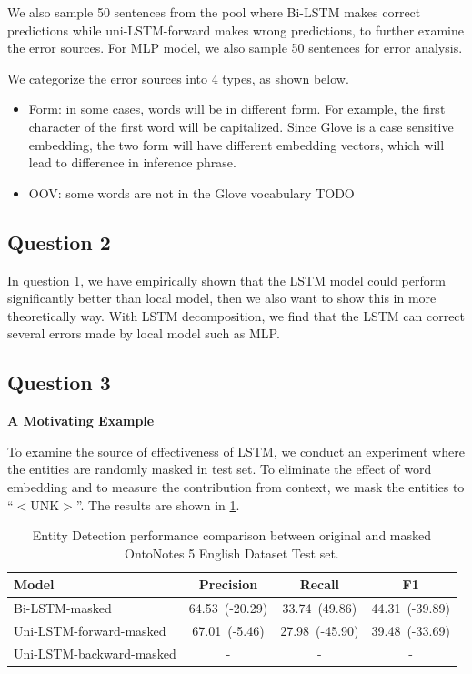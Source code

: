 \documentclass{article}
\begin{document}
We also sample 50 sentences from the pool where Bi-LSTM makes correct predictions while uni-LSTM-forward makes wrong predictions, to further examine the error sources. For MLP model, we also sample 50 sentences for error analysis.

We categorize the error sources into 4 types, as shown below.

\begin{itemize}
	\item Form: in some cases, words will be in different form. For example, the first character of the first word will be capitalized. Since Glove is a case sensitive embedding, the two form will have different embedding vectors, which will lead to difference in inference phrase. 
	\item OOV: some words are not in the Glove vocabulary TODO
\end{itemize}









\subsection{Question 2}

In question 1, we have empirically shown that the LSTM model could perform significantly better than local model, then we also want to show this in more theoretically way. With LSTM decomposition, we find that the LSTM can correct several errors made by local model such as MLP. 



\subsection{Question 3}

\noindent \textbf{A Motivating Example} 

To examine the source of effectiveness of LSTM, we conduct an experiment where the entities are randomly masked in test set. To eliminate the effect of word embedding and to measure the contribution from context, we mask the entities to ``$<$UNK$>$''. The results are shown in \ref{tab:mask}.

\begin{table}[t]
	\centering
	\begin{tabular}{l@{\qquad}ccc}
		\toprule
		\textbf{Model}		& \textbf{Precision}	& \textbf{Recall}	& \textbf{F1} \\ \midrule
		Bi-LSTM-masked 	& 64.53~(-20.29) 			& 33.74~(49.86)			& 44.31~(-39.89) \\ 
		Uni-LSTM-forward-masked & 67.01~(-5.46) 		& 27.98~(-45.90) 			& 39.48~(-33.69) \\ 
		Uni-LSTM-backward-masked& - 		& -				& - \\ 
		\bottomrule
	\end{tabular}
	\vspace{3mm}
	\caption{Entity Detection performance comparison between original and masked OntoNotes 5 English Dataset Test set.}
	\label{tab:mask}
\end{table}
\end{document}
